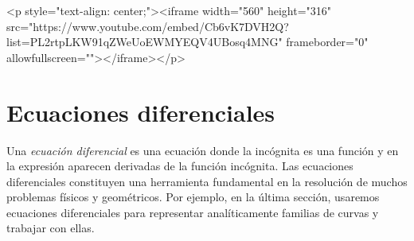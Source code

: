\begin{rawhtml}
<p style="text-align: center;"><iframe width="560" height="316" src="https://www.youtube.com/embed/Cb6vK7DVH2Q?list=PL2rtpLKW91qZWeUoEWMYEQV4UBosq4MNG" frameborder="0" allowfullscreen=""></iframe></p>
\end{rawhtml}


%
%


\newpage
\section{Ecuaciones diferenciales}

Una \emph{ecuación diferencial} es una ecuación donde la incógnita es una función y en la expresión aparecen derivadas de la función incógnita.
Las ecuaciones diferenciales constituyen una herramienta fundamental en la resolución de muchos problemas físicos y geométricos.
Por ejemplo, en la última sección, usaremos ecuaciones diferenciales para representar analíticamente familias de curvas y trabajar con ellas.

